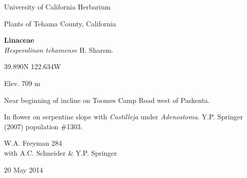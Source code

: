 \documentclass[letterpaper,10pt]{article}
\begin{document}
\begin{minipage}[t]{0.40\textwidth}

\begin{center}
University of California Herbarium \\
\begin{large}
Plants of Tehama County, California \\
\end{large}
\vspace{\baselineskip}
\textbf{Linaceae} \\
\textit{Hesperolinon tehamense} H. Sharsm.\\
\end{center}

\begin{footnotesize}

\begin{multicols}{2}
39.890\textdegree N 122.634\textdegree W
\columnbreak
\begin{flushright}
Elev. 709 m
\end{flushright}
\end{multicols}

Near beginning of incline on Toomes Camp Road west of Paskenta.
\vspace{\baselineskip}

In flower on serpentine slope with \textit{Castilleja} under \textit{Adenostoma}. Y.P. Springer (2007) population \#1303.

\begin{multicols}{2}
W.A. Freyman 284 \\
with A.C. Schneider \& Y.P. Springer
\columnbreak
\begin{flushright}
20 May 2014
\end{flushright}
\end{multicols}

\end{footnotesize}

\end{minipage}
%
\hspace{2cm}
%
\end{document}
